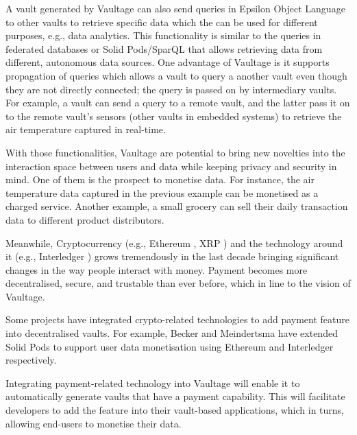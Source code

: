\documentclass[]{article}
\begin{document}
A vault generated by Vaultage can also send queries \cite{vaultage-query} in Epsilon Object Language \cite{epsilon} to other vaults to retrieve specific data which the can be used for different purposes, e.g., data analytics. This functionality is similar to the queries in federated databases \cite{db2} or Solid Pods/SparQL \cite{comunica} that allows retrieving data from different, autonomous data sources. One advantage of Vaultage is it supports propagation of queries which allows a vault to query a another vault even though they are not directly connected; the query is passed on by intermediary vaults. For example, a vault can send a query to a remote vault, and the latter pass it on to the remote vault's sensors (other vaults in embedded systems) to retrieve the air temperature captured in real-time. 

With those functionalities, Vaultage are potential to bring new novelties into the interaction space between users and data while keeping privacy and security in mind. One of them  is the prospect to monetise data. For instance, the air temperature data captured in the previous example can be monetised as a charged service. Another example, a small grocery can sell their daily transaction data to different product distributors.  

Meanwhile, Cryptocurrency (e.g., Ethereum \cite{ethereum},  XRP \cite{xrpl}) and the technology around it (e.g., Interledger \cite{interledger})  grows tremendously in the last decade bringing significant changes in the way people interact with money. Payment becomes more decentralised, secure, and trustable than ever before, which in line to the vision of Vaultage.    

Some projects have integrated crypto-related technologies to add payment feature into decentralised vaults. For example, Becker \cite{becker2021monetising} and Meindertsma \cite{meindertsma2019web}  have extended Solid Pods to support user data monetisation using Ethereum and Interledger respectively. 

Integrating payment-related technology into Vaultage will enable it to automatically generate vaults that have a payment capability. This will facilitate developers to add the feature into their vault-based applications, which in turns, allowing end-users to monetise their data.   
\end{document}

